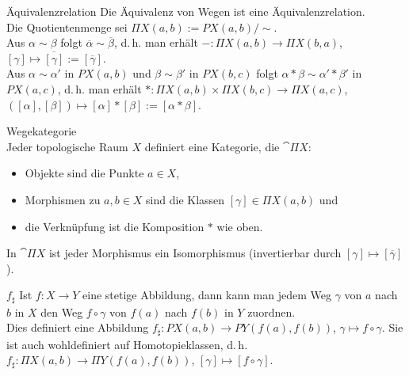 \begin{Lemma}{Äquivalenzrelation}
    Die Äquivalenz von Wegen ist eine Äquivalenzrelation. \\
    Die Quotientenmenge sei $\Pi X(a, b) := PX(a, b) / \sim$. \\
    Aus $\alpha \sim \beta$ folgt $\overline{\alpha} \sim \overline{\beta}$,
    d.\,h. man erhält $-\colon \Pi X(a, b) \rightarrow \Pi X(b, a)$,
    $[\gamma] \mapsto \overline{[\gamma]} := [\overline{\gamma}]$. \\
    Aus $\alpha \sim \alpha'$ in $PX(a, b)$ und $\beta \sim \beta'$ in
    $PX(b, c)$ folgt $\alpha \ast \beta \sim \alpha' \ast \beta'$ in
    $PX(a, c)$, d.\,h. man erhält
    $\ast\colon \Pi X(a, b) \times \Pi X(b, c) \rightarrow \Pi X(a, c)$,
    $([\alpha], [\beta]) \mapsto [\alpha] \ast [\beta] := [\alpha \ast \beta]$.
\end{Lemma}

\linie

\begin{Def}{Wegekategorie}\\
    Jeder topologische Raum $X$ definiert eine Kategorie,
    die  $\cat{\Pi X}$:
    \begin{itemize}
        \item
        Objekte sind die Punkte $a \in X$,
        
        \item
        Morphismen zu $a, b \in X$ sind die Klassen $[\gamma] \in \Pi X(a, b)$
        und
        
        \item
        die Verknüpfung ist die Komposition $\ast$ wie oben.
    \end{itemize}
    In $\cat{\Pi X}$ ist jeder Morphismus ein Isomorphismus
    (invertierbar durch $[\gamma] \mapsto [\overline{\gamma}]$).
\end{Def}

\linie

\begin{Def}{$f_\sharp$}
    Ist $f\colon X \rightarrow Y$ eine stetige Abbildung, dann kann
    man jedem Weg $\gamma$ von $a$ nach $b$ in $X$
    den Weg $f \circ \gamma$ von $f(a)$ nach $f(b)$ in $Y$ zuordnen. \\
    Dies definiert eine Abbildung
    $f_\sharp\colon PX(a, b) \rightarrow PY(f(a), f(b))$,
    $\gamma \mapsto f \circ \gamma$.
    Sie ist auch wohldefiniert auf Homotopieklassen, d.\,h.
    $f_\sharp\colon \Pi X(a, b) \rightarrow \Pi Y(f(a), f(b))$,
    $[\gamma] \mapsto [f \circ \gamma]$.
\end{Def}


